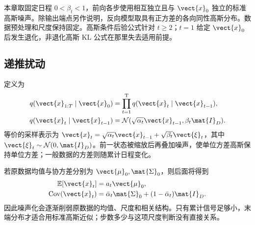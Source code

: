 \documentclass[../textbook.tex]{subfiles}
\begin{document}
\begin{assumption}[离散高斯扩散的推导条件]
本章取固定日程 $0<\beta_t<1$，前向各步使用相互独立且与 $\vect{x}_0$ 独立的标准高斯噪声。除输出端点另作说明，反向模型取具有正方差的各向同性高斯分布。数据预处理和尺度保持固定。高斯条件后验公式针对 $t\ge2$；$t=1$ 给定 $\vect{x}_0$ 后发生退化，非退化高斯 KL 公式在那里失去适用前提。
\end{assumption}

\subsection{递推扰动}
定义为
\begin{equation}\label{eq:diff-forward}
 \begin{aligned}
  q(\vect{x}_{1:T}\mid \vect{x}_0)&=\prod_{t=1}^{\mathrm{T}}q(\vect{x}_t\mid \vect{x}_{t-1}),\\
  q(\vect{x}_t\mid \vect{x}_{t-1})&=\mathcal N(\sqrt{\alpha_t}\vect{x}_{t-1},\beta_t \mat{I}_D).
 \end{aligned}
\end{equation}
等价的采样表示为 $\vect{x}_t=\sqrt{\alpha_t}\vect{x}_{t-1}+\sqrt{\beta_t}\vect{\xi}_t$，其中 $\vect{\xi}_t\sim\mathcal N(0,\mat{I}_D)$。前一状态被缩放后再叠加噪声，使单位方差高斯保持单位方差；一般数据的方差则随累计日程变化。

若原数据均值与协方差分别为 $\vect{\mu}_0,\mat{\Sigma}_0$，则后面将得到
\begin{equation}
 \begin{aligned}
  \mathbb E[\vect{x}_t]&=a_t\vect{\mu}_0,\\
  \operatorname{Cov}(\vect{x}_t)&=\bar\alpha_t\mat{\Sigma}_0+(1-\bar\alpha_t)\mat{I}_D.
 \end{aligned}
\end{equation}
因此噪声化会逐渐削弱原数据的均值、尺度和相关结构。只有累计信号足够小，末端分布才适合用标准高斯近似；步数多少与这项尺度判断没有直接关系。
\end{document}
